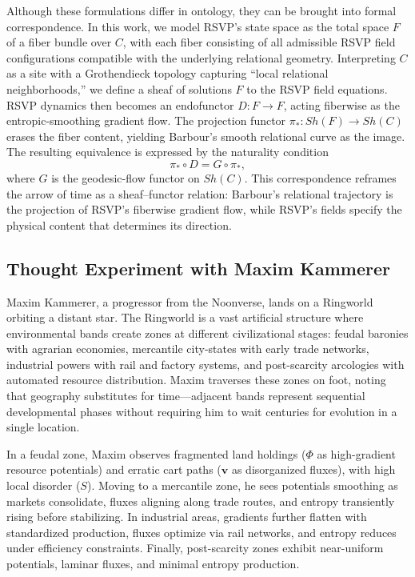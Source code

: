\documentclass[11pt]{article}
\theoremstyle{plain}
\theoremstyle{definition}
\begin{document}
Although these formulations differ in ontology, they can be brought into formal correspondence. In this work, we model RSVP’s state space as the total space $F$ of a fiber bundle over $C$, with each fiber consisting of all admissible RSVP field configurations compatible with the underlying relational geometry. Interpreting $C$ as a site with a Grothendieck topology capturing “local relational neighborhoods,” we define a sheaf of solutions $F$ to the RSVP field equations. RSVP dynamics then becomes an endofunctor $D : F \to F$, acting fiberwise as the entropic-smoothing gradient flow. The projection functor $\pi_* : Sh(F) \to Sh(C)$ erases the fiber content, yielding Barbour’s smooth relational curve as the image. The resulting equivalence is expressed by the naturality condition
\[
\pi_* \circ D = G \circ \pi_* ,
\]
where $G$ is the geodesic-flow functor on $Sh(C)$. This correspondence reframes the arrow of time as a sheaf–functor relation: Barbour’s relational trajectory is the projection of RSVP’s fiberwise gradient flow, while RSVP’s fields specify the physical content that determines its direction.

\subsection{Thought Experiment with Maxim Kammerer}
Maxim Kammerer, a progressor from the Noonverse, lands on a Ringworld orbiting a distant star. The Ringworld is a vast artificial structure where environmental bands create zones at different civilizational stages: feudal baronies with agrarian economies, mercantile city-states with early trade networks, industrial powers with rail and factory systems, and post-scarcity arcologies with automated resource distribution. Maxim traverses these zones on foot, noting that geography substitutes for time—adjacent bands represent sequential developmental phases without requiring him to wait centuries for evolution in a single location.

In a feudal zone, Maxim observes fragmented land holdings ($\Phi$ as high-gradient resource potentials) and erratic cart paths ($\mathbf{v}$ as disorganized fluxes), with high local disorder ($S$). Moving to a mercantile zone, he sees potentials smoothing as markets consolidate, fluxes aligning along trade routes, and entropy transiently rising before stabilizing. In industrial areas, gradients further flatten with standardized production, fluxes optimize via rail networks, and entropy reduces under efficiency constraints. Finally, post-scarcity zones exhibit near-uniform potentials, laminar fluxes, and minimal entropy production.
\end{document}
